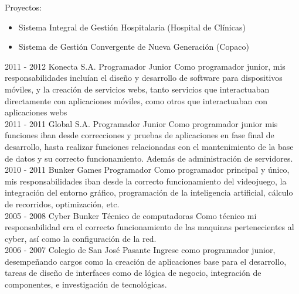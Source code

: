 \documentclass[]{friggeri-cv}
\begin{document}
\begin{entrylist}
{        Proyectos:
        \begin{itemize}
            \item Sistema Integral de Gestión Hospitalaria (Hospital de
                Clínicas)
            \item Sistema de Gestión Convergente de Nueva Generación (Copaco)
        \end{itemize}}
\entry
    {2011 - 2012}
    {Konecta S.A.}
    {Programador Junior}
    {Como programador junior, mis responsabilidades incluían el diseño y
        desarrollo de software para dispositivos móviles, y la creación de
        servicios webs, tanto servicios que interactuaban directamente con
        aplicaciones móviles, como otros que interactuaban con aplicaciones webs
        \\}
\entry
    {2011 - 2011}
    {Global S.A.}
    {Programador Junior}
    {Como programador junior mis funciones iban desde correcciones y pruebas de
        aplicaciones en fase final de desarrollo, hasta realizar funciones
        relacionadas con el mantenimiento de la base de datos y su correcto
        funcionamiento. Además de administración de servidores. \\}
\entry
    {2010 - 2011}
    {Bunker Games}
    {Programador}
    {Como programador principal y único, mis responsabilidades iban desde la
        correcto funcionamiento del videojuego, la integración del entorno
        gráfico, programación de la inteligencia artificial, cálculo de
        recorridos, optimización, etc. \\}
\entry
    {2005 - 2008}
    {Cyber Bunker}
    {Técnico de computadoras}
    {Como técnico mi responsabilidad era el correcto funcionamiento de las
        maquinas pertenecientes al cyber, así como la configuración de la red.
        \\}
\entry
    {2006 - 2007}
    {Colegio de San José}
    {Pasante}
    {Ingrese como programador junior, desempeñando cargos como la
creación de aplicaciones base para el desarrollo, tareas de diseño de
interfaces como de lógica de negocio, integración de componentes, e
investigación de tecnológicas. \\}

\end{entrylist}


\newpage
\end{document}
